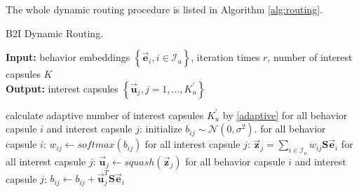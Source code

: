 \documentclass[sigconf]{acmart}
\begin{document}
The whole dynamic routing procedure is listed in Algorithm \ref{alg:routing}.

\begin{algorithm}[htb]
\caption{B2I Dynamic Routing.}
\label{alg:routing}
\begin{flushleft}
\textbf{Input:} behavior embeddings $\left\{ \overrightarrow{\boldsymbol{e}}_i, i \in \mathcal{I}_u \right\}$, iteration times $r$, number of interest capsules $K$ \\
\textbf{Output:} interest capsules $\left\{\overrightarrow{\boldsymbol{u}}_j, j=1,...,K_{u}^\prime\right\}$
\end{flushleft}
\begin{algorithmic}[1]
\State calculate adaptive number of interest capsules $K_{u}^\prime$ by \eqref{adaptive}
\State for all behavior capsule $i$ and interest capsule $j$: initialize $b_{ij} \sim \mathcal N(0, \sigma ^ 2)$.
\State for all behavior capsule $i$: $w_{ij} \leftarrow softmax(b_{ij})$
\State for all interest capsule $j$: $\overrightarrow{\boldsymbol{z}}_j = \sum_{i\in \mathcal{I}_u} w_{ij} \boldsymbol{\textrm{S}} \overrightarrow{\boldsymbol{e}}_i$
\State for all interest capsule $j$: $\overrightarrow{\boldsymbol{u}}_j \leftarrow squash(\overrightarrow{\boldsymbol{z}}_j)$
\State for all behavior capsule $i$ and interest capsule $j$: $b_{ij} \leftarrow b_{ij} + \overrightarrow{\boldsymbol{u}}_j^T \boldsymbol{\textrm{S}} \overrightarrow{\boldsymbol{e}}_i$
\EndFor
\State {}
\end{algorithmic}
\end{algorithm}
\end{document}

